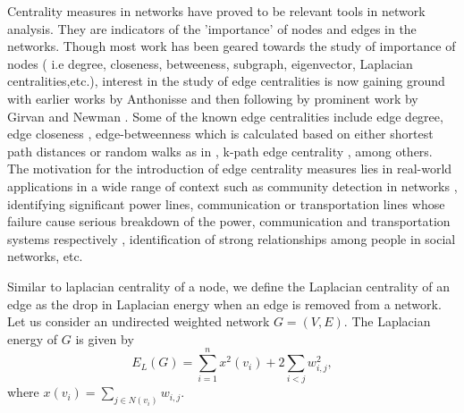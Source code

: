 \documentclass[10pt,a4paper]{article}
\begin{document}
	Centrality measures in networks have proved to be relevant tools in network analysis. They are indicators of the 'importance' of nodes and edges in the networks. Though most work has been geared towards the study of importance of nodes ( i.e degree, closeness, betweeness, subgraph, eigenvector, Laplacian centralities,etc.), interest in the study of edge centralities is now gaining ground with earlier works by  Anthonisse \citep{anthonisse1971rush} and then following by prominent work by Girvan and Newman \citep{newman2004finding}. Some of the known edge centralities include edge degree, edge closeness \citep{ortiz2016centrality}, edge-betweenness which is calculated based on either shortest path distances or random walks as in \citep{newman2004finding}, k-path edge centrality \cite{alahakoon2011k}, among others. The motivation for the introduction of edge centrality measures lies in real-world applications in a wide range of context such as community detection in networks \citep{newman2004finding}, identifying significant power lines, communication or transportation lines whose failure cause serious breakdown of the  power, communication and transportation systems respectively \citep{ortiz2016centrality}, identification of strong relationships among people in social networks, etc. 

Similar to laplacian centrality of a node, we define the Laplacian centrality of an edge as the drop in Laplacian energy when an edge is removed from a network.
Let us consider an undirected weighted network $G=(V,E)$. The Laplacian energy of $G$ is given by
\begin{equation}
E_L(G) = \sum_{i=1}^n x^2(v_i) + 2 \sum_{i<j} w^2_{i,j},
\label{edgelapG}
\end{equation} 	 
where $x(v_i) = \sum_{j\in N(v_i)} w_{i,j}$.
\end{document}
